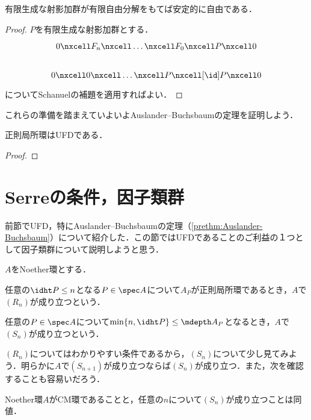 \begin{prop}
	有限生成な射影加群が有限自由分解をもてば安定的に自由である．
\end{prop}

\begin{proof}
	$P$を有限生成な射影加群とする．
	\[\begin{tikzcd}
		0\nxcell F_n\nxcell\dots\nxcell F_0\nxcell P\nxcell0\\
		0\nxcell 0\nxcell\dots\nxcell P\nxcell[\id] P\nxcell0
	\end{tikzcd}\]	
	についてSchanuelの補題を適用すればよい．
\end{proof}

これらの準備を踏まえていよいよAuslander--Buchsbaumの定理を証明しよう．
\begin{thm}\label{thm:Auslander--Buchsbaumの定理}
	正則局所環はUFDである．
\end{thm}

\begin{proof}
	
\end{proof}
\section{Serreの条件，因子類群}

前節でUFD，特にAuslander--Buchsbaumの定理（\ref{prethm:Auslander-Buchsbaum}）について紹介した．この節ではUFDであることのご利益の１つとして因子類群について説明しようと思う．

\begin{defi}[Serreの条件]
	$A$をNoether環とする．
	\begin{sakura}
		\item 任意の$\idht P\leq n$となる$P\in\spec A$について$A_P$が正則局所環であるとき，$A$で$(R_n)$が成り立つという．
		\item 任意の$P\in\spec A$について$\min\{n,\idht P\}\leq\mdepth A_P$となるとき，$A$で$(S_n)$が成り立つという．
	\end{sakura}
\end{defi}

$(R_n)$についてはわかりやすい条件であるから，$(S_n)$について少し見てみよう．明らかに$A$で$(S_{n+1})$が成り立つならば$(S_n)$が成り立つ．また，次を確認することも容易いだろう．

\begin{prop}
	Noether環$A$がCM環であることと，任意の$n$について$(S_n)$が成り立つことは同値．
\end{prop}

